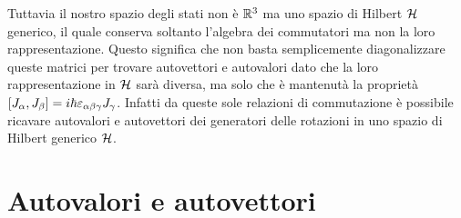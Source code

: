 Tuttavia il nostro spazio degli stati non è $ \mathbb{R}^3 $ ma uno spazio di Hilbert $ \operatorname{\mathcal{H}} $ generico, il quale conserva soltanto l'algebra dei commutatori ma 
non la loro rappresentazione. Questo significa che non basta semplicemente diagonalizzare queste matrici per trovare autovettori e autovalori dato che 
la loro rappresentazione in $ \operatorname{\mathcal{H}} $ sarà diversa, ma solo che è mantenutà la proprietà $ [J_\alpha, J_\beta] = i\hbar\varepsilon_{\alpha \beta \gamma} J_\gamma $.
Infatti da queste sole relazioni di commutazione è possibile ricavare autovalori e autovettori dei generatori delle rotazioni in uno spazio di Hilbert 
generico $ \operatorname{\mathcal{H}} $.

\section{Autovalori e autovettori}

